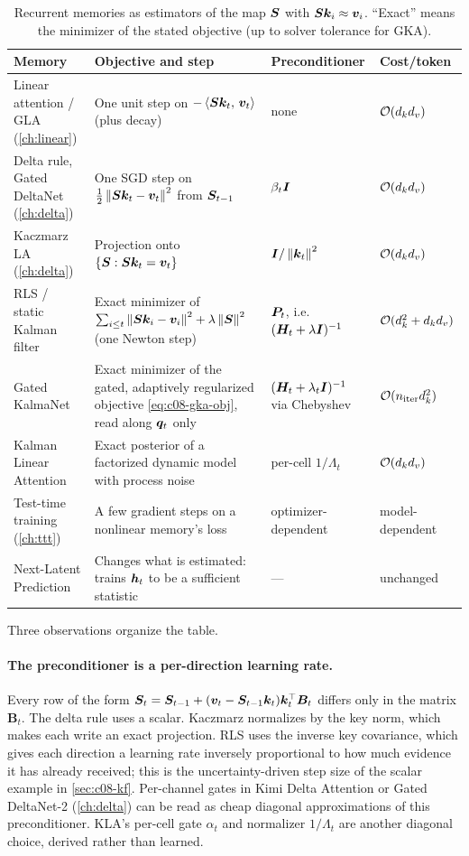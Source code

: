 \begin{table}[t]
\centering
\small
\caption{Recurrent memories as estimators of the map $\bm{S}$ with $\bm{S}\bm{k}_i\approx\bm{v}_i$. ``Exact''
means the minimizer of the stated objective (up to solver tolerance for GKA).}
\label{tab:c08-ladder}
\begin{tabularx}{\textwidth}{@{}>{\raggedright\arraybackslash}p{3.0cm}>{\raggedright\arraybackslash}X>{\raggedright\arraybackslash}p{3.1cm}>{\raggedright\arraybackslash}p{2.7cm}@{}}
\toprule
\textbf{Memory} & \textbf{Objective and step} & \textbf{Preconditioner} & \textbf{Cost/token} \\
\midrule
Linear attention / GLA (\cref{ch:linear}) & One unit step on $-\left\langle \bm{S}\bm{k}_t,\, \bm{v}_t\right\rangle$ (plus decay) & none & $\mathcal{O}(d_kd_v)$ \\
Delta rule, Gated DeltaNet (\cref{ch:delta}) & One SGD step on $\tfrac12\left\lVert \bm{S}\bm{k}_t-\bm{v}_t\right\rVert^2$ from $\bm{S}_{t-1}$ & $\beta_t\bm{I}$ & $\mathcal{O}(d_kd_v)$ \\
Kaczmarz LA (\cref{ch:delta}) & Projection onto $\{\bm{S}:\bm{S}\bm{k}_t=\bm{v}_t\}$ & $\bm{I}/\left\lVert \bm{k}_t\right\rVert^2$ & $\mathcal{O}(d_kd_v)$ \\
RLS / static Kalman filter & Exact minimizer of $\sum_{i\le t}\left\lVert \bm{S}\bm{k}_i-\bm{v}_i\right\rVert^2+\lambda\left\lVert \bm{S}\right\rVert^2$ (one Newton step) & $\bm{P}_t$, i.e.\ $(\bm{H}_t+\lambda\bm{I})^{-1}$ & $\mathcal{O}(d_k^2+d_kd_v)$ \\
Gated KalmaNet & Exact minimizer of the gated, adaptively regularized objective \eqref{eq:c08-gka-obj}, read along $\bm{q}_t$ only & $(\bm{H}_t+\lambda_t\bm{I})^{-1}$ via Chebyshev & $\mathcal{O}(n_\text{iter}d_k^2)$ \\
Kalman Linear Attention & Exact posterior of a factorized dynamic model with process noise & per-cell $1/\Lambda_t$ & $\mathcal{O}(d_kd_v)$ \\
Test-time training (\cref{ch:ttt}) & A few gradient steps on a nonlinear memory's loss & optimizer-dependent & model-dependent \\
Next-Latent Prediction & Changes what is estimated: trains $\bm{h}_t$ to be a sufficient statistic & --- & unchanged \\
\bottomrule
\end{tabularx}
\end{table}

Three observations organize the table.

\paragraph{The preconditioner is a per-direction learning rate.} Every row of the form
$\bm{S}_t=\bm{S}_{t-1}+(\bm{v}_t-\bm{S}_{t-1}\bm{k}_t)\bm{k}_t^{\top}\bm{B}_t$ differs only in the matrix $\bm{B}_t$. The
delta rule uses a scalar. Kaczmarz normalizes by the key norm, which makes each write an exact
projection. RLS uses the inverse key covariance, which gives each direction a learning rate
inversely proportional to how much evidence it has already received; this is the
uncertainty-driven step size of the scalar example in \cref{sec:c08-kf}. Per-channel gates in
Kimi Delta Attention or Gated DeltaNet-2 (\cref{ch:delta}) can be read as cheap diagonal
approximations of this preconditioner. KLA's per-cell gate $\alpha_t$ and normalizer $1/\Lambda_t$
are another diagonal choice, derived rather than learned.

